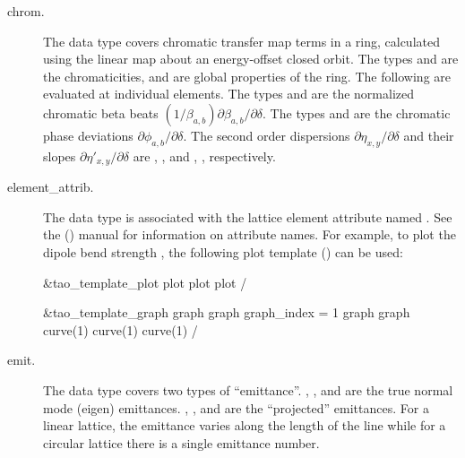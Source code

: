 \begin{description}
  \item[chrom.] \Newline
The  data type covers chromatic transfer map terms in a ring, 
calculated using the linear map about an energy-offset closed orbit. 
The types  and  are the chromaticities, and are
global properties of the ring. The following are evaluated at individual elements.
The types  and  are the normalized chromatic beta beats 
$(1/\beta_{a,b})\partial\beta_{a,b}/\partial\delta$.
The types  and  are the chromatic phase deviations 
$\partial\phi_{a,b}/\partial\delta$.
The second order dispersions $\partial\eta_{x,y}/\partial\delta$ and their slopes $\partial\eta'_{x,y}/\partial\delta$ are 
, , and , , respectively.


  \item[element_attrib.] \Newline
The  data type is associated with the
lattice element attribute named . See the \bmad
(\cite{b:bmad}) manual for information on attribute names. For
example, to plot the dipole bend strength , the following
plot template () can be used:
\begin{example}
  &tao_template_plot
    plot%
    plot%
    plot%
  /

  &tao_template_graph
    graph%
    graph%
    graph_index = 1
    graph%
    graph%
    curve(1)%
    curve(1)%
    curve(1)%
  /
\end{example}

  \item[emit.] \Newline
The  data type covers two types of
``emittance''. , , and  are the true
normal mode (eigen) emittances. , , and
 are the ``projected'' emittances\cite{b:emit}. 
For a linear lattice, the emittance varies along the length
of the line while for a circular lattice there is a single emittance
number. 


\end{description}
